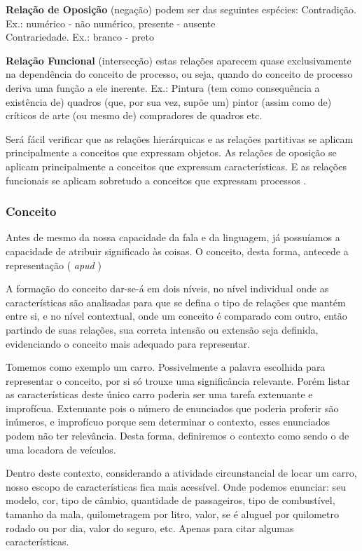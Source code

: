 \textbf{Relação de Oposição} (negação) podem ser das seguintes espécies:
Contradição. Ex.: numérico - não numérico, presente - ausente\\
Contrariedade. Ex.: branco - preto

\textbf{Relação Funcional} (intersecção) estas relações aparecem quase exclusivamente na dependência do conceito de processo, ou seja, quando do conceito de processo deriva uma função a ele inerente. Ex.: Pintura (tem como consequência a existência de) quadros (que, por sua vez, supõe um) pintor (assim como de) críticos de arte (ou mesmo de) compradores de quadros etc.

Será fácil verificar que as relações hierárquicas e as relações partitivas se aplicam principalmente a conceitos que expressam objetos. As relações de oposição se aplicam principalmente a conceitos que expressam características. E as relações funcionais se aplicam sobretudo a conceitos que expressam processos \citep{dahlberg:1978.teoria}.

\subsubsection{\hspace*{3pt} Conceito}

Antes de mesmo da nossa capacidade da fala e da linguagem, já possuíamos a capacidade de atribuir significado às coisas. O conceito, desta forma, antecede a representação (\citealp{edelman:1995.biologia} \textit{apud} \citealp{lacerda:2012.linguagem})

A formação do conceito dar-se-á em dois níveis, no nível individual onde as características são analisadas para que se defina o tipo de relações que mantém entre si, e no nível contextual, onde um conceito é comparado com outro, então partindo de suas relações, sua correta intensão ou extensão seja definida, evidenciando o conceito mais adequado para representar.

Tomemos como exemplo um carro. Possivelmente a palavra escolhida para representar o conceito, por si só trouxe uma significância relevante. Porém listar as características deste único carro poderia ser uma tarefa extenuante e improfícua. Extenuante pois o número de enunciados que poderia proferir são inúmeros, e improfícuo porque sem determinar o contexto, esses enunciados podem não ter relevância. Desta forma, definiremos o contexto como sendo o de uma locadora de veículos.

Dentro deste contexto, considerando a atividade circunstancial de locar um carro, nosso escopo de características fica mais acessível. Onde podemos enunciar: seu modelo, cor, tipo de câmbio, quantidade de passageiros, tipo de combustível, tamanho da mala, quilometragem por litro, valor, se é aluguel por quilometro rodado ou por dia, valor do seguro, etc. Apenas para citar algumas características.

